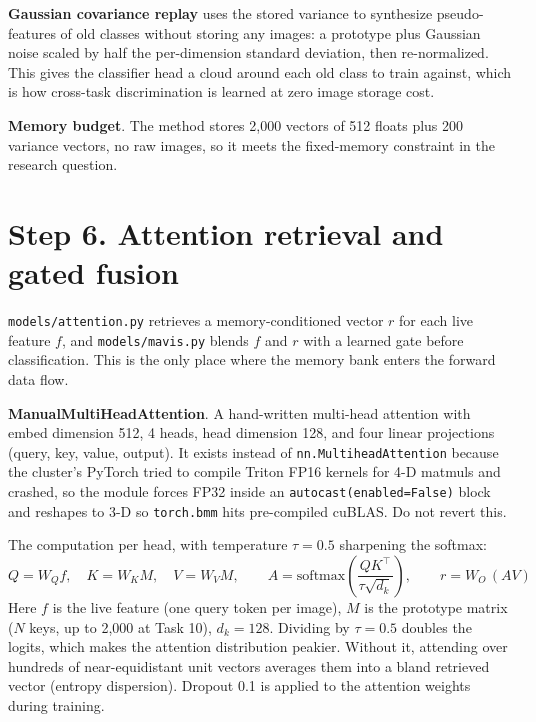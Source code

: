 \documentclass[11pt,a4paper]{article}
\newcommand{\code}[1]{\texttt{#1}}
\begin{document}
\textbf{Gaussian covariance replay} uses the stored variance to synthesize pseudo-features of old classes without storing any images: a prototype plus Gaussian noise scaled by half the per-dimension standard deviation, then re-normalized. This gives the classifier head a cloud around each old class to train against, which is how cross-task discrimination is learned at zero image storage cost.

\textbf{Memory budget}. The method stores 2{,}000 vectors of 512 floats plus 200 variance vectors, no raw images, so it meets the fixed-memory constraint in the research question.

\section{Step 6. Attention retrieval and gated fusion}

\code{models/attention.py} retrieves a memory-conditioned vector $r$ for each live feature $f$, and \code{models/mavis.py} blends $f$ and $r$ with a learned gate before classification. This is the only place where the memory bank enters the forward data flow.

\textbf{ManualMultiHeadAttention}. A hand-written multi-head attention with embed dimension 512, 4 heads, head dimension 128, and four linear projections (query, key, value, output). It exists instead of \code{nn.MultiheadAttention} because the cluster's PyTorch tried to compile Triton FP16 kernels for 4-D matmuls and crashed, so the module forces FP32 inside an \code{autocast(enabled=False)} block and reshapes to 3-D so \code{torch.bmm} hits pre-compiled cuBLAS. Do not revert this.

The computation per head, with temperature $\tau = 0.5$ sharpening the softmax:
\begin{equation}
Q = W_Q f, \quad K = W_K M, \quad V = W_V M, \qquad A = \mathrm{softmax}\!\left(\frac{Q K^{\top}}{\tau \sqrt{d_k}}\right), \qquad r = W_O \, (A V)
\end{equation}
Here $f$ is the live feature (one query token per image), $M$ is the prototype matrix ($N$ keys, up to 2{,}000 at Task 10), $d_k = 128$. Dividing by $\tau = 0.5$ doubles the logits, which makes the attention distribution peakier. Without it, attending over hundreds of near-equidistant unit vectors averages them into a bland retrieved vector (entropy dispersion). Dropout 0.1 is applied to the attention weights during training.
\end{document}
